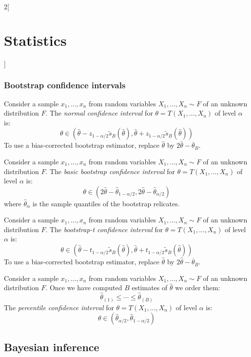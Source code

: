 \documentclass[../../../main_math.tex]{subfiles}
\begin{document}
\begin{multicols}{2}[\section{Statistics}]
  \subsubsection{Bootstrap confidence intervals}
  \begin{definition}
    Consider a sample $x_1,\ldots,x_n$ from \iid random variables $X_1,\ldots,X_n\sim F$ of an unknown distribution $F$. The \emph{normal confidence interval} for $\theta=T(X_1,\ldots,X_n)$ of level $\alpha$ is: $$\theta\in(\hat\theta-z_{1-\alpha/2}\tilde{s}_B(\hat\theta),\hat\theta+z_{1-\alpha/2}\tilde{s}_B(\hat\theta))$$ To use a bias-corrected bootstrap estimator, replace ${\hat\theta}$ by $2{\hat\theta}-\overline{\theta}_B$.
  \end{definition}
  \begin{definition}
    Consider a sample $x_1,\ldots,x_n$ from \iid random variables $X_1,\ldots,X_n\sim F$ of an unknown distribution $F$. The \emph{basic bootstrap confidence interval} for $\theta=T(X_1,\ldots,X_n)$ of level $\alpha$ is: $$\theta\in(2\hat\theta-\hat\theta_{1-\alpha/2},2\hat\theta-\hat\theta_{\alpha/2})$$ where $\hat\theta_\alpha$ is the sample quantiles of the bootstrap relicates.
  \end{definition}
  \begin{definition}
    Consider a sample $x_1,\ldots,x_n$ from \iid random variables $X_1,\ldots,X_n\sim F$ of an unknown distribution $F$. The \emph{bootstrap-t confidence interval} for $\theta=T(X_1,\ldots,X_n)$ of level $\alpha$ is: $$\theta\in(\hat\theta-t_{1-\alpha/2}\tilde{s}_B(\hat\theta),\hat\theta+t_{1-\alpha/2}\tilde{s}_B(\hat\theta))$$ To use a bias-corrected bootstrap estimator, replace ${\hat\theta}$ by $2{\hat\theta}-\overline{\theta}_B$.
  \end{definition}
  \begin{definition}
    Consider a sample $x_1,\ldots,x_n$ from \iid random variables $X_1,\ldots,X_n\sim F$ of an unknown distribution $F$. Once we have computed $B$ estimates of $\hat\theta$ we order them:
    $${\hat\theta}_{(1)}\leq\cdots\leq{\hat\theta}_{(B)}$$
    The \emph{percentile confidence interval} for $\theta=T(X_1,\ldots,X_n)$ of level $\alpha$ is: $$\theta\in(\hat\theta_{\alpha/2},\hat\theta_{1-\alpha/2})$$
  \end{definition}
  \subsection{Bayesian inference}

\end{multicols}
\end{document}
